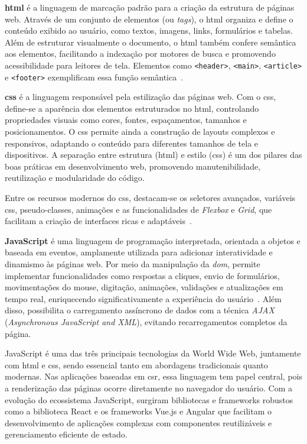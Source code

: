 \textbf{\acrfull{html}} é a linguagem de marcação padrão para a criação da estrutura de páginas web. Através de um conjunto de elementos (ou \textit{tags}), o \acrshort{html} organiza e define o conteúdo exibido ao usuário, como textos, imagens, links, formulários e tabelas. Além de estruturar visualmente o documento, o \acrshort{html} também confere semântica aos elementos, facilitando a indexação por motores de busca e promovendo acessibilidade para leitores de tela. Elementos como \texttt{<header>}, \texttt{<main>}, \texttt{<article>} e \texttt{<footer>} exemplificam essa função semântica~\cite{alura_htmlcssjs}.

\textbf{\acrfull{css}} é a linguagem responsável pela estilização das páginas web. Com o \acrshort{css}, define-se a aparência dos elementos estruturados no \acrshort{html}, controlando propriedades visuais como cores, fontes, espaçamentos, tamanhos e posicionamentos. O \acrshort{css} permite ainda a construção de layouts complexos e responsivos, adaptando o conteúdo para diferentes tamanhos de tela e dispositivos. A separação entre estrutura (\acrshort{html}) e estilo (\acrshort{css}) é um dos pilares das boas práticas em desenvolvimento web, promovendo manutenibilidade, reutilização e modularidade do código.

Entre os recursos modernos do \acrshort{css}, destacam-se os seletores avançados, variáveis \acrshort{css}, pseudo-classes, animações e as funcionalidades de \textit{Flexbox} e \textit{Grid}, que facilitam a criação de interfaces ricas e adaptáveis~\cite{herocode_diferencas}.

\textbf{JavaScript} é uma linguagem de programação interpretada, orientada a objetos e baseada em eventos, amplamente utilizada para adicionar interatividade e dinamismo às páginas web. Por meio da manipulação da \textit{\acrfull{dom}}, permite implementar funcionalidades como respostas a cliques, envio de formulários, movimentações do mouse, digitação, animações, validações e atualizações em tempo real, enriquecendo significativamente a experiência do usuário~\cite{alura_htmlcssjs}. Além disso, possibilita o carregamento assíncrono de dados com a técnica \textit{AJAX} (\textit{Asynchronous JavaScript and XML}), evitando recarregamentos completos da página.

JavaScript é uma das três principais tecnologias da World Wide Web, juntamente com \acrshort{html} e \acrshort{css}, sendo essencial tanto em abordagens tradicionais quanto modernas. Nas aplicações baseadas em \acrshort{csr}, essa linguagem tem papel central, pois a renderização das páginas ocorre diretamente no navegador do usuário. Com a evolução do ecossistema JavaScript, surgiram bibliotecas e frameworks robustos como a biblioteca React e os frameworks Vue.js e Angular que facilitam o desenvolvimento de aplicações complexas com componentes reutilizáveis e gerenciamento eficiente de estado.

